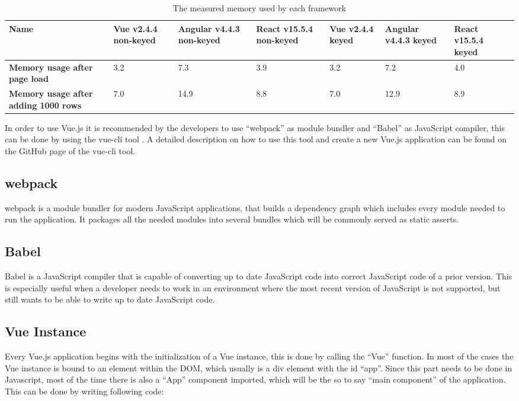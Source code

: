 \begin{table}[H]
    \centering
    \begin{tabular}{| C{2.2cm} | C{1.5cm} | C{1.5cm} | C{1.5cm} | C{1.5cm} | C{1.5cm} | C{1.5cm} |}
    \hline
    \textbf{Name} & \textbf{Vue v2.4.4 non-keyed} & \textbf{Angular v4.4.3 non-keyed} & \textbf{React v15.5.4 non-keyed} & \textbf{Vue v2.4.4 keyed} & \textbf{Angular v4.4.3 keyed} & \textbf{React v15.5.4 keyed} \\ \hline
    \textbf{Memory usage after page load} & 3.2 & 7.3 & 3.9 & 3.2 & 7.2 & 4.0 \\ \hline
    \textbf{Memory usage after adding 1000 rows} & 7.0 & 14.9 & 8.8 & 7.0 & 12.9 & 8.9 \\
    \hline
    \end{tabular}
    \caption{The measured memory used by each framework}
    \label{tab:framework_perf_mem}
\end{table}

In order to use Vue.js it is recommended by the developers to use ``webpack''  as module bundler and ``Babel'' as JavaScript compiler, this can be done by using the vue-cli tool \cite{webpack} \cite{Babel} \cite{vuecli}. A detailed description on how to use this tool and create a new Vue.js application can be found on the GitHub page of the vue-cli tool.

\subsection{webpack}
webpack is a module bundler for modern JavaScript applications, that builds a dependency graph which includes every module needed to run the application. It packages all the needed modules into several bundles which will be commonly served as static asserts.

\subsection{Babel}
Babel is a JavaScript compiler that is capable of converting up to date JavaScript code into correct JavaScript code of a prior version. This is especially useful when a developer needs to work in an environment where the most recent version of JavaScript is not supported, but still wants to be able to write up to date JavaScript code.

\subsection{Vue Instance}
Every Vue.js application begins with the initialization of a Vue instance, this is done by calling the ``Vue'' function. In most of the cases the Vue instance is bound to an element within the DOM, which usually is a div element with the id ``app''. Since this part needs to be done in Javascript, most of the time there is also a ``App'' component imported, which will be the so to say ``main component'' of the application. This can be done by writing following code:

